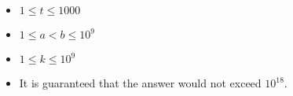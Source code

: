 \begin{itemize}
    \tightlist
    \item $1 \leq t \leq 1000$
    \item $1 \leq a < b \leq 10^9$
    \item $1 \leq k \leq 10^9$
    \item It is guaranteed that the answer would not exceed $10^{18}$.
\end{itemize}
